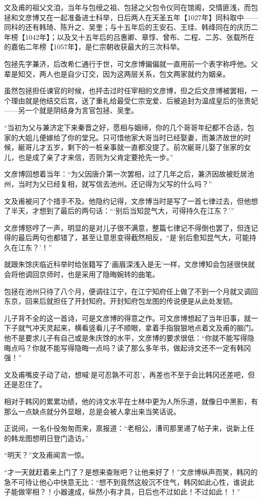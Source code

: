 文及甫的祖父文洎，当年与包绶之祖、包拯之父包令仪同在馆阁，交情匪浅，而包拯和文彦博又在一起准备进士科举，日后两人在天圣五年【1027年】同科取中——同科的还有韩琦、陈升之、吴奎；与十五年后的王安石、王珪、韩绛同在的庆历二年榜【1042年】；以及又十五年后的吕惠卿、章惇、曾布、二程、二苏、张载所在的嘉佑二年榜【1057年】，是仁宗朝收获最大的三次科举。

包拯先字兼济，后改希仁通行于世，可文彦博偏偏就一直用前一个表字称呼他。父辈是知交，两人也是自少订交，因为这两层关系，包文两家就约为姻亲。

虽然包拯担任谏官的时候，也抨击过时任宰相的文彦博，但之后文彦博被罢相，一个理由就是他结交后宫，送了重礼给最受仁宗宠爱、后被追封为温成皇后的张贵妃——另一个就是阴结身为言官包拯、吴奎。

“当初为父与兼济定下来秦晋之好，愿相与姻缔，你的几个哥哥年纪都不合适，包家的大姐儿便嫁给了你的堂兄。只可惜他家大哥当时已经娶妻，而兼济故世的时候，綖哥儿才五岁，剩下的一桩亲事就一直都没提了。前次綖哥儿娶了张家的女儿，也是成了亲了才来信，否则为父肯定要抢先一步。”

文彦博回想着当年：“为父因唐介第一次罢相，过了几年之后，兼济因故被贬居池州，当时为父已经复相，就写信去池州。还记得为父写的什么吗？”

文及甫被问了个措手不及。他隐约记得，文彦博当时是写了一首七律过去，但他想了半天，才想到了最后的两句话：“‘别后当知昆气大，可得持久在江东？’”

文彦博怒哼了一声，明显的是对儿子很不满意，整篇七律记不得倒也罢了，但连记得的最后两句也都错了，甚至让意思变得截然相反，“是‘别后愈知昆气大，可能持久在江东？’！”

就跟朱馀庆临近科举时给张籍写了‘画眉深浅入是无’一样，文彦博知会包拯很快就会将他调回京师时，也是采用了隐晦婉转的曲笔。

包拯在池州只待了八个月，便调往江宁，在江宁知府任上做了不到一个月就又调回东京，回来后就担任了开封知府。开封知府包龙图的传说便是从此处发轫。

儿子背不全的这一首诗，可是文彦博的得意之作。可文彦博想起了当年旧事，就一下子就气冲天灵起来，横看竖看儿子不顺眼，拿着手指狠狠地点着文及甫的脑门。他不是要求儿子有自己或是朱庆馀的水平，文彦博的要求很低：“你就不能写得隐晦点吗？你就不能写得隐晦一点吗？读了那么多年书，做起诗文还不一定有韩冈强！”

文及甫嘴皮子动了动，想喊‘是可忍孰不可忍’，再差也不至于会比韩冈还差吧，但还是忍住了。

相对于韩冈的累累功绩，他的诗文水平在士林中更为人所乐道，就像日中黑影，有那么一点缺点就分外显眼，总是会被人拿出来当笑话说。

正说间，一名仆役匆匆而来，禀报道：“老相公，漕司那里递了帖子来，说新上任的韩龙图想明日登门造访。”

“明天？”文及甫闻言一惊。

“才一天就赶着来上门了？是想来查账吧？让他来好了！”文彦博纵声而笑，韩冈的急不可待让他心中快意无比：“想不到竟然这般沉不住气，韩冈如此心性，谁说此子能做宰相？！小器速成，纵然小有才具，日后也不过如此！不过如此！！”

